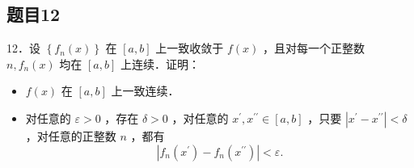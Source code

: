 \documentclass{article}
\begin{document}
\subsection{题目12}
12．设 \(\left\{f_{n}(x)\right\}\) 在 \([a, b]\) 上一致收敛于 \(f(x)\) ，且对每一个正整数 \(n, f_{n}(x)\) 均在 \([a, b]\) 上连续．证明：

\begin{itemize}
  \item[（1）] \(f(x)\) 在 \([a, b]\) 上一致连续．
  \item[（2）] 对任意的 \(\varepsilon>0\) ，存在 \(\delta>0\) ，对任意的 \(x^{\prime}, x^{\prime \prime} \in[a, b]\) ，只要 \(\left|x^{\prime}-x^{\prime \prime}\right|<\delta\) ，对任意的正整数 \(n\) ，都有
\[
\left|f_{n}\left(x^{\prime}\right)-f_{n}\left(x^{\prime \prime}\right)\right|<\varepsilon .
\]
\end{itemize}
\end{document}
